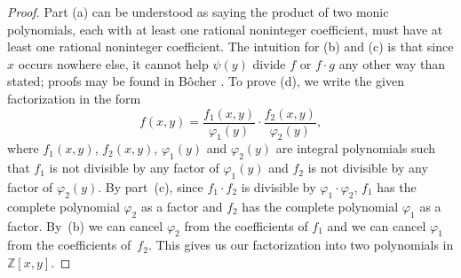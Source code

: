 \documentclass{article}
\theoremstyle{plain}
\theoremstyle{definition}
\newcommand{\Zed}{\mathbb{Z}}   %
\begin{document}
\begin{proof}
Part (a) can be understood as saying the product of two monic polynomials, each with at least one
rational noninteger coefficient, must have at least one rational noninteger coefficient.  The 
intuition for (b) and (c) is that since $x$ occurs nowhere else, it cannot help
$\psi(y)$ divide $f$ or $f\cdot g$ any other way than stated; proofs may be found in
B\^ocher \cite[pp.~203--204]{Boc}.
To prove
(d), we write the given factorization in the form
\[
f(x,y) 
= \frac{f_1(x,y)}{\varphi_1(y)}\cdot \frac{f_2(x,y)}{\varphi_2(y)},
\]
where $f_1(x,y)$, $f_2(x,y)$, $\varphi_1(y)$ and $\varphi_2(y)$ are
integral polynomials such that $f_1$ is not divisible by any factor of
$\varphi_1(y)$ and $f_2$ is not divisible by any factor of
$\varphi_2(y)$. By part~(c), since $f_1 \cdot f_2$ is divisible by
$\varphi_1 \cdot \varphi_2$, $f_1$ has the complete polynomial
$\varphi_2$ as a factor and $f_2$ has the complete polynomial
$\varphi_1$ as a factor. By~(b) we can cancel $\varphi_2$ from the
coefficients of $f_1$ and we can cancel $\varphi_1$ from the
coefficients of~$f_2$. This gives us our factorization into two
polynomials in $\Zed[x,y]$.
\end{proof}
\end{document}
